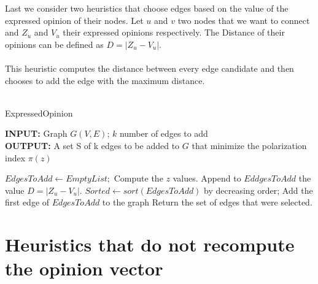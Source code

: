 \noindent Last we consider two heuristics that choose edges based on the value of the expressed opinion of their nodes. 
Let $u$ and $v$ two nodes that we want to connect and $Z_u$ and $V_u$ their expressed opinions respectively. 
The Distance of their opinions can be defined as $D=|Z_u - V_u|$.
\\
\\
This heuristic computes the distance between every edge candidate and then chooses to add the edge with the maximum distance.
\\
\\
\begin{algorithm}[H]
	\caption{ExpressedΟpinion}
	\label{alg:expressedOpinion}
	
	\begin{flushleft}
        		\textbf{INPUT:} Graph $G(V, E)$; $k$ number of edges to add\\
		\vspace{6pt}
        		\textbf{OUTPUT:} A set S of k edges to be added to $G$ that minimize the polarization
		\\ index $\pi(z)$
	\end{flushleft}
	
	\begin{algorithmic}[1]
			\STATE $EdgesToAdd \leftarrow Empty List;$
			\STATE Compute the $z$ values.
				\STATE Append to $EddgesToAdd$ the value $D=|Z_u - V_u|$.
			\ENDFOR
			\STATE $Sorted \leftarrow sort(EdgesToAdd)$ by decreasing order;
			\STATE Add the first edge of $EdgesToAdd$ to the graph
		\ENDFOR
		\STATE Return the set of edges that were selected.
	\end{algorithmic}
	
\end{algorithm}
\clearpage




\section{Heuristics that do not recompute the opinion vector}
\label{sec:netChangesConsidered}
\vspace{10pt}

